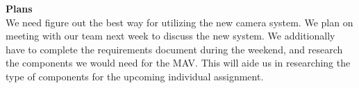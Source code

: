 \documentclass[onecolumn, oneside, letterpaper, draftclsnofoot, 10pt, compsoc]{IEEEtran}
\begin{document}
\noindent \textbf{Plans}\\
We need figure out the best way for utilizing the new camera system. We plan on meeting with our team next week to discuss the new system. We additionally have to complete the requirements document during the weekend, and research the components we would need for the MAV. This will aide us in researching the type of components for the upcoming individual assignment.

\end{document}
